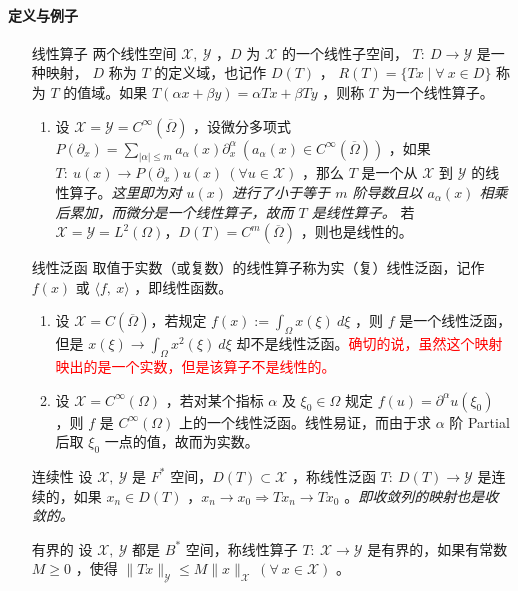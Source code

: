 	\paragraph{定义与例子}
	\begin{enumerate}[leftmargin=2cm, label=\arabic*]
		\item[线性算子]两个线性空间 $\mathscr{X},\ \mathscr{Y}$ ，$D$ 为 $\mathscr{X}$ 的一个线性子空间， $T:\ D\to\mathscr{Y}$ 是一种映射， $D$ 称为 $T$ 的定义域，也记作 $D(T)$ ， $R(T)=\{Tx\mid \forall\ x\in D\}$ 称为 $T$ 的值域。如果 $T(\alpha x + \beta y) = \alpha Tx + \beta Ty$ ，则称 $T$ 为一个线性算子。
		\begin{enumerate}[leftmargin=1cm, label=(\arabic*)]
			\item 设 $\mathscr{X} = \mathscr{Y} = C^{\infty}(\overline{\Omega})$ ，设微分多项式 $P(\partial_x) = \sum\limits_{|\alpha|\leqslant m} a_{\alpha}(x)\partial_x^{\alpha}\ (a_{\alpha}(x)\in C^{\infty}(\overline{\Omega}))$ ，如果 $T:\ u(x)\to P(\partial_x)u(x)\ (\forall u\in\mathscr{X})$ ，那么 $T$ 是一个从 $\mathscr{X}$ 到 $\mathscr{Y}$ 的线性算子。\textit{这里即为对 $u(x)$ 进行了小于等于 $m$ 阶导数且以 $a_{\alpha}(x)$ 相乘后累加，而微分是一个线性算子，故而 $T$ 是线性算子。} 若 $\mathscr{X} = \mathscr{Y} = L^2(\Omega)$，$D(T) = C^m(\overline{\Omega})$ ，则也是线性的。
		\end{enumerate}
		\item[线性泛函] 取值于实数（或复数）的线性算子称为实（复）线性泛函，记作 $f(x)$ 或 $\langle f,\ x\rangle$ ，即线性函数。
		\begin{enumerate}[leftmargin=1cm, label=(\arabic*)]
			\item 设 $\mathscr{X} =C(\overline{\Omega})$，若规定 $f(x) := \int_{\Omega} x(\xi)\ d\xi$ ，则 $f$ 是一个线性泛函，但是 $x(\xi)\to \int_{\Omega} x^2(\xi) \ d\xi$ 却不是线性泛函。\textcolor{red}{确切的说，虽然这个映射映出的是一个实数，但是该算子不是线性的。}
			\item 设 $\mathscr{X} = C^{\infty}(\Omega)$ ，若对某个指标 $\alpha$ 及 $\xi_0\in\Omega$ 规定 $f(u) = \partial^{\alpha} u(\xi_0)$ ，则 $f$ 是 $C^{\infty}(\Omega)$ 上的一个线性泛函。线性易证，而由于求 $\alpha$ 阶 Partial 后取 $\xi_0$ 一点的值，故而为实数。
		\end{enumerate}
		\item[连续性] 设 $\mathscr{X},\ \mathscr{Y}$ 是 $F^*$ 空间，$D(T)\subset \mathscr{X}$ ，称线性泛函 $T:\ D(T)\to\mathscr{Y}$ 是连续的，如果 $x_n\in D(T)$ ，$x_n\to x_0 \Longrightarrow Tx_n\to Tx_0$ 。\textit{即收敛列的映射也是收敛的。}
		\item[有界的] 设 $\mathscr{X},\ \mathscr{Y}$ 都是 $B^*$ 空间，称线性算子 $T:\ \mathscr{X}\to\mathscr{Y}$ 是有界的，如果有常数 $M\geqslant 0$ ，使得 $\|Tx\|_{\mathscr{Y}} \leqslant M\|x\|_{\mathscr{X}}\ (\forall\ x\in\mathscr{X})$ 。

\end{enumerate}
